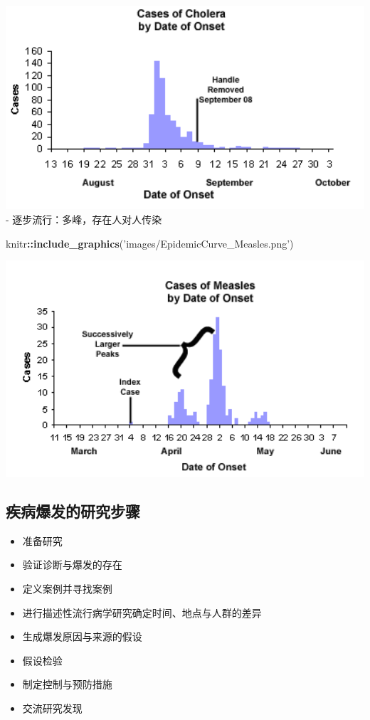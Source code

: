 \documentclass[]{book}
\newenvironment{Shaded}{\begin{snugshade}}{\end{snugshade}}
\newcommand{\KeywordTok}[1]{\textcolor[rgb]{0.13,0.29,0.53}{\textbf{#1}}}
\newcommand{\NormalTok}[1]{#1}
\newcommand{\OperatorTok}[1]{\textcolor[rgb]{0.81,0.36,0.00}{\textbf{#1}}}
\newcommand{\StringTok}[1]{\textcolor[rgb]{0.31,0.60,0.02}{#1}}
\providecommand{\tightlist}{%
  \setlength{\itemsep}{0pt}\setlength{\parskip}{0pt}}
\begin{document}
\includegraphics[width=5.5in]{images/EpidemicCurve_Cholera}
- 逐步流行：多峰，存在人对人传染

\begin{Shaded}
\begin{Highlighting}[]
\NormalTok{knitr}\OperatorTok{::}\KeywordTok{include_graphics}\NormalTok{(}\StringTok{'images/EpidemicCurve_Measles.png'}\NormalTok{)}
\end{Highlighting}
\end{Shaded}

\includegraphics[width=5.53in]{images/EpidemicCurve_Measles}

\subsection{疾病爆发的研究步骤}

\begin{itemize}
\tightlist
\item
  准备研究
\item
  验证诊断与爆发的存在
\item
  定义案例并寻找案例
\item
  进行描述性流行病学研究确定时间、地点与人群的差异
\item
  生成爆发原因与来源的假设
\item
  假设检验
\item
  制定控制与预防措施
\item
  交流研究发现
\end{itemize}
\end{document}
